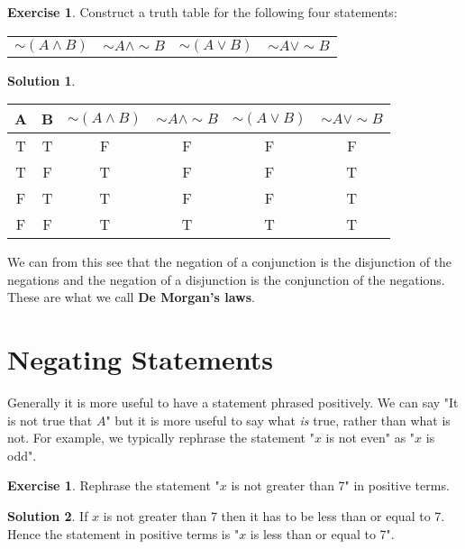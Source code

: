 \documentclass[a4paper, 11pt]{report}
\theoremstyle{plain}
\theoremstyle{definition}
\newtheorem{exrc}[thm]{Exercise}
\newtheorem*{sltn}{Solution}
\renewcommand{\neg}{{\sim}} %
\begin{document}
\begin{exrc}
  Construct a truth table for the following four statements:\\
  \begin{tabular}{cccc}
    $\neg(A\land B)$& $\neg A\land \neg B$ & $\neg(A\lor B)$ & $\neg A \lor \neg B$
  \end{tabular} 
\end{exrc}
\begin{sltn}
  \begin{table}[h!]
    \centering
    \begin{tabular}{cccccc}
    \hline
    A&  B&  $\neg(A\land B)$& $\neg A\land \neg B$ & $\neg(A\lor B)$ & $\neg A \lor \neg B$ \\
    \hline
   T&  T&  F&  F& F & F  \\
   T&  F&  T&  F& F & T \\
   F&  T&  T&  F& F & T \\
   F&  F&  T&  T& T & T \\
    \hline
    \end{tabular}
  \end{table}
\end{sltn}
  We can from this see that the negation of a conjunction is the disjunction of
  the negations and the negation of a disjunction is the conjunction of the
  negations. These are what we call \textbf{De Morgan's laws}.

  \section{Negating Statements}
  \label{sec:negating_statements}
  
  Generally it is more useful to have a statement phrased positively. We can
  say "It is not true that $A$" but it is more useful to say what \textit{is} true, rather than what is not. For example, we typically rephrase the
  statement "$x$ is not even" as "$x$ is odd".

  \begin{exrc}
    Rephrase the statement "$x$ is not greater than 7" in positive terms.
  \end{exrc}
  
  \begin{sltn}
    If $x$ is not greater than 7 then it has to be less than or equal to 7.
    Hence the statement in positive terms is "$x$ is less than or equal to 7".
  \end{sltn}
\end{document}
